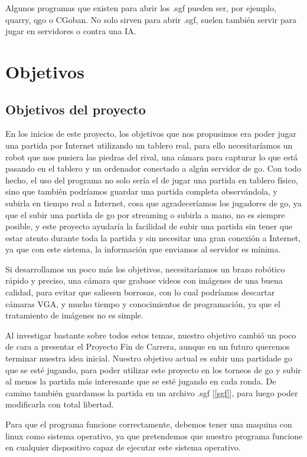 \documentclass[12pt,a4paper]{report}
\begin{document}
Algunos programas que existen para abrir los .sgf pueden ser, por ejemplo,
quarry, qgo o CGoban. No solo sirven para abrir .sgf, suelen también servir para
jugar en servidores o contra una IA. %


\chapter{Objetivos} 

\section{Objetivos del proyecto} 

En los inicios de este proyecto, los objetivos que nos propusimos era poder
jugar una partida por Internet utilizando un tablero real, para ello
necesitaríamos un robot que nos pusiera las piedras del rival, una cámara para
capturar lo que está pasando en el tablero y un ordenador conectado a algún
servidor de go. Con todo hecho, el uso del programa no solo sería el de jugar
una partida en tablero físico, sino que también podríamos guardar una partida
completa observándola, y subirla en tiempo real a Internet, cosa que
agradeceríamos los jugadores de go, ya que el subir una partida de go por
streaming o subirla a mano, no es siempre posible, y este proyecto ayudaría la
facilidad de subir una partida sin tener que estar atento durante toda la
partida y sin necesitar una gran conexión a Internet, ya que con este sistema,
la información que enviamos al servidor es mínima. 

Si desarrollamos un poco más los objetivos, necesitaríamos un brazo robótico
rápido y preciso, una cámara que grabase videos con imágenes de una buena calidad, para evitar que saliesen borrosas,
con lo cual podríamos descartar cámaras VGA, y mucho tiempo y conocimientos de
programación, ya que el tratamiento de imágenes no es simple. 

Al investigar bastante sobre todos estos temas, nuestro objetivo cambió un poco
de cara a presentar el Proyecto Fin de Carrera, aunque en un futuro queremos
terminar nuestra idea inicial. Nuestro objetivo actual es subir una partidade go
que se esté jugando, para poder utilizar este proyecto en los torneos de go y
subir al menos la partida más interesante que se esté jugando en cada ronda. De
camino también guardamos la partida en un archivo .sgf [\ref{sgf}], para luego
poder modificarla con total libertad.

Para que el programa funcione correctamente, debemos tener una maquina con linux como sistema operativo, ya que pretendemos que nuestro programa funcione en cualquier dispositivo capaz de ejecutar este sistema operativo.   
\end{document}
